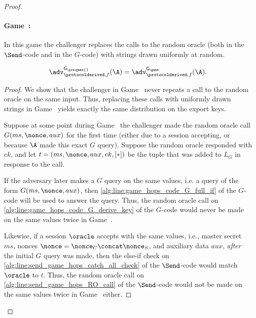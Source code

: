\begin{proof}



\newgame
\paragraph{Game~\game:} \label{game:drop_RO} 
In this game the challenger replaces the calls to the random oracle 
(both in the $\Send$-code and in the $G$-code)
with strings drawn uniformly at random.

\begin{claim}
\begin{equation}
	\adv_{\protocolderived,f}^{\mathsf{G_{\prevgame{}}}}(\A) 
		= \adv_{\protocolderived,f}^{\mathsf{G_\game}}(\A) .
\end{equation}
\end{claim}

\begin{proof}
We show that the challenger in Game~\prevgame{} never repeats a call to the random oracle on the same input.
Thus, replacing these calls with uniformly drawn strings in Game~\game{} yields exactly the same distribution on the export keys.

Suppose at some point during Game~\prevgame{} the challenger made the random oracle call $G(ms, \nonce, aux)$ for the first time
(either due to a session accepting,
or because $\A$ made this exact $G$ query).
Suppose the random oracle responded with $ek$,
and let $t = (ms, \nonce, aux, ek, [*])$ be the tuple that was added to $L_G$ in response to the call.

If the adversary later  makes a $G$ query on the same values,
i.e. a query of the form $G(ms, \nonce,aux)$,
then \cref{alg:line:game_hops_code_G_full_if} of the $G$-code will be used to answer the query.
Thus, the random oracle call on \cref{alg:line:game_hops_code_G_derive_key} of the $G$-code would never be made on the same values twice in Game~\prevgame{}.

Likewise, 
if a session $\oracle$ accepts with the same values,
i.e., master secret $ms$, nonces $\nonce = \nonce_{C} \concat \nonce_{S}$, 
and auxiliary data $aux$,
\emph{after} the initial $G$ query was made,
then the else-if check on \cref{alg:line:send_game_hops_catch_all_check} of the $\Send$-code would match $\oracle$ to $t$. 
Thus, the random oracle call on \cref{alg:line:send_game_hops_RO_call} of the $\Send$-code would not be made on the same values twice in Game~\prevgame{} either.
\end{proof}




\end{proof}

